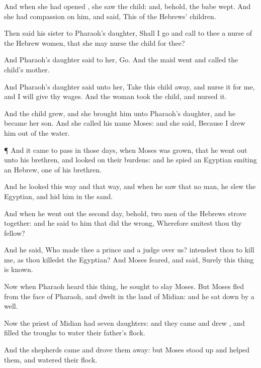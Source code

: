 {And when she had
opened
{}, she
saw the
child: and, behold, the
babe
wept. And she had
compassion on him, and
said, This
{} of the
Hebrews’
children.

Then
said his
sister to
Pharaoh’s
daughter, Shall I
go and
call to thee a
nurse of the
Hebrew
women, that she may
nurse the
child for thee?

And
Pharaoh’s
daughter
said to her,
Go. And the
maid
went and
called the
child’s
mother.

And
Pharaoh’s
daughter
said unto her,
Take this
child
away, and
nurse it for me, and I will
give
{} thy
wages. And the
woman
took the
child, and
nursed it.

And the
child
grew, and she
brought him unto
Pharaoh’s
daughter, and he became her
son. And she
called his
name
Moses: and she
said, Because I
drew him out of the
water.


\par }{\PP {}¶ And it came to pass in those
days, when
Moses was
grown, that he went
out unto his
brethren, and
looked on their
burdens: and he
spied an
Egyptian
smiting an
Hebrew, one of his
brethren.

And he
looked this
way and that
way, and when he
saw that
{} no
man, he
slew the
Egyptian, and
hid him in the
sand.

And when he went
out the
second
day, behold,
two
men of the
Hebrews
strove together: and he
said to him that did the
wrong, Wherefore
smitest thou thy
fellow?

And he
said, Who
made
thee a
prince and a
judge over us?
intendest thou to
kill me, as thou
killedst the
Egyptian? And
Moses
feared, and
said,
Surely this
thing is
known.

Now when
Pharaoh
heard this
thing, he
sought to
slay
Moses. But
Moses
fled from the
face of
Pharaoh, and
dwelt in the
land of
Midian: and he sat
down by a
well.


\par }{\PP {}Now the
priest of
Midian had
seven
daughters: and they
came and
drew
{}, and
filled the
troughs to
water their
father’s
flock.

And the
shepherds
came and drove them
away: but
Moses stood
up and
helped them, and
watered their
flock.

}
